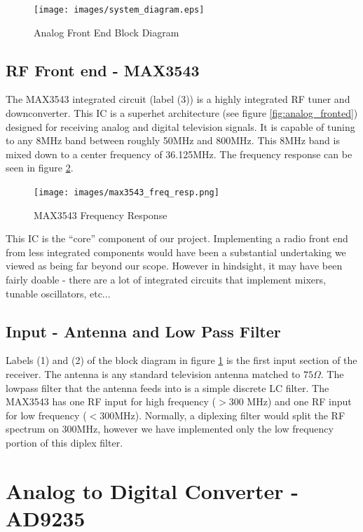\documentclass[a4paper, 12pt, notitlepage]{article}
\begin{document}
\begin{figure}
  \centering
  \caption{Analog Front End Block Diagram}
  \label{fig:analog_block_diagram}
  \texttt{[image: images/system\_diagram.eps]}
\end{figure}

\subsection{RF Front end - MAX3543}
The MAX3543 integrated circuit \cite{max3543} (label (3)) is a highly integrated RF tuner and downconverter.  This IC is a superhet architecture (see figure \ref{fig:analog_fronted}) designed for receiving analog and digital television signals.  It is capable of tuning to any 8MHz band between roughly 50MHz and 800MHz.  This 8MHz band is mixed down to a center frequency of 36.125MHz.  The frequency response can be seen in figure \ref{fig:max3543_freq_resp}.

\begin{figure}
  \texttt{[image: images/max3543\_freq\_resp.png]}
  \caption{MAX3543 Frequency Response}
  \label{fig:max3543_freq_resp}
\end{figure}

This IC is the ``core'' component of our project.  Implementing a radio front end from less integrated components would have been a substantial undertaking we viewed as being far beyond our scope.  However in hindsight, it may have been fairly doable - there are a lot of integrated circuits that implement mixers, tunable oscillators, etc...

\subsection{Input - Antenna and Low Pass Filter}
Labels (1) and (2) of the block diagram in figure \ref{fig:analog_block_diagram} is the first input section of the receiver.  The antenna is any standard television antenna matched to $75\Omega$.  The lowpass filter that the antenna feeds into is a simple discrete LC filter.  The MAX3543 has one RF input for high frequency ($>$300 MHz) and one RF input for low frequency ($<$300MHz).  Normally, a diplexing filter would split the RF spectrum on 300MHz, however we have implemented only the low frequency portion of this diplex filter.


\section{Analog to Digital Converter - AD9235}
\end{document}
